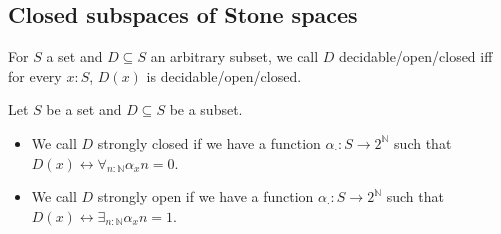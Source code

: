 \subsection{Closed subspaces of Stone spaces}
%
\begin{definition}
  For $S$ a set and $D\subseteq S$ an arbitrary subset, we call $D$ decidable/open/closed 
  iff for every $x:S$, $D(x)$ is decidable/open/closed. 
\end{definition}
\begin{definition}
  Let $S$ be a set and $D\subseteq S$ be a subset. 
  \begin{itemize}
    \item We call $D$ strongly closed if we have a function 
  $\alpha_{\cdot}:S\to 2^\mathbb N$ such that $ D(x) \leftrightarrow \forall_{n:\mathbb N} \alpha_x n = 0$. 
    \item We call $D$ strongly open if we have a function 
  $\alpha_{\cdot}:S\to 2^\mathbb N$ such that $ D(x) \leftrightarrow \exists_{n:\mathbb N} \alpha_x n = 1$. 
  \end{itemize} 
\end{definition}



